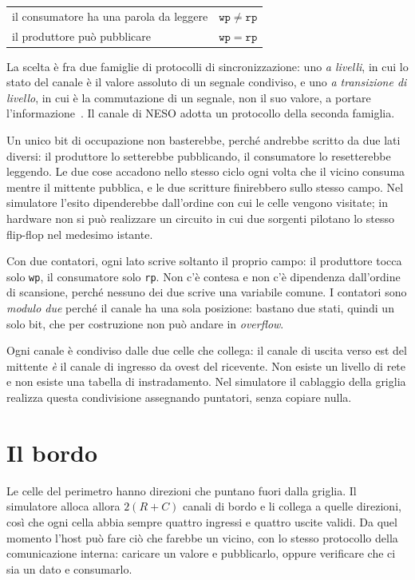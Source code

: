 \begin{center}
\begin{tabular}{ll}
    \toprule
    il consumatore ha una parola da leggere & $\mathtt{wp} \neq \mathtt{rp}$ \\
    il produttore può pubblicare & $\mathtt{wp} = \mathtt{rp}$ \\
    \bottomrule
\end{tabular}
\end{center}

La scelta è fra due famiglie di protocolli di sincronizzazione: uno
\emph{a livelli}, in cui lo stato del canale è il valore assoluto di un
segnale condiviso, e uno \emph{a transizione di livello}, in cui è la commutazione
di un segnale, non il suo valore, a portare l'informazione~\cite{Sutherland1989}.
Il canale di NESO adotta un protocollo della seconda famiglia.

Un unico bit di occupazione non basterebbe, perché andrebbe scritto da due lati
diversi: il produttore lo setterebbe pubblicando, il consumatore lo resetterebbe
leggendo. Le due cose accadono nello stesso ciclo ogni volta che il vicino
consuma mentre il mittente pubblica, e le due scritture finirebbero sullo stesso
campo. Nel simulatore l'esito dipenderebbe dall'ordine con cui le celle vengono
visitate; in hardware non si può realizzare un circuito in cui due sorgenti pilotano lo stesso flip-flop nel
medesimo istante.

Con due contatori, ogni lato scrive soltanto il proprio campo: il produttore
tocca solo \texttt{wp}, il consumatore solo \texttt{rp}. Non c'è contesa e non
c'è dipendenza dall'ordine di scansione, perché nessuno dei due scrive una
variabile comune. I contatori sono \emph{modulo due} perché il canale ha una
sola posizione: bastano due stati, quindi un solo bit, che per costruzione non
può andare in \emph{overflow}.

Ogni canale è condiviso dalle due celle che collega: il canale di uscita verso
est del mittente \emph{è} il canale di ingresso da ovest del ricevente. Non
esiste un livello di rete e non esiste una tabella di instradamento. Nel
simulatore il cablaggio della griglia realizza questa condivisione assegnando
puntatori, senza copiare nulla.


\section{Il bordo}
\label{sec:bordo}

Le celle del perimetro hanno direzioni che puntano fuori dalla griglia. Il
simulatore alloca allora $2(R+C)$ canali di bordo e li collega a quelle
direzioni, così che ogni cella abbia sempre quattro ingressi e quattro uscite
validi. Da quel momento l'host può fare ciò che farebbe un vicino, con lo stesso
protocollo della comunicazione interna: caricare un valore e pubblicarlo, oppure
verificare che ci sia un dato e consumarlo.


